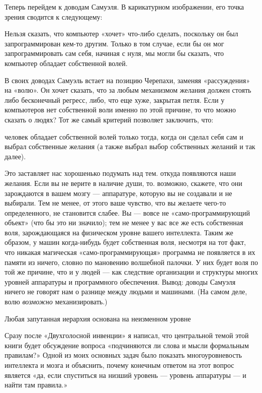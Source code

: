 \documentclass[../main.tex]{subfiles}
\begin{document}
Теперь перейдем к доводам Самуэля. В карикатурном изображении, его точка зрения сводится к следующему:

Нельзя сказать, что компьютер «хочет» что-либо сделать, поскольку он был запрограммирован кем-то другим. Только в том случае, если бы он мог запрограммировать сам себя, начиная с нуля, мы могли бы сказать, что компьютер обладает собственной волей.

В своих доводах Самуэль встает на позицию Черепахи, заменяя «рассуждения» на «волю». Он хочет сказать, что за любым механизмом желания должен стоять либо бесконечный регресс, либо, что еще хуже, закрытая петля. Если у компьютеров нет собственной воли именно по этой причине, то что можно сказать о людях? Тот же самый критерий позволяет заключить, что:

человек обладает собственной волей только тогда, когда он сделал себя сам и выбрал собственные желания (а также выбрал выбор собственных желаний и так далее).

Это заставляет нас хорошенько подумать над тем. откуда появляются наши желания. Если вы не верите в наличие души, то. возможно, скажете, что они зарождаются в вашем мозгу --- аппаратуре, которую вы не создавали и не выбирали. Тем не менее, от этого ваше чувство, что вы желаете чего-то определенного, не становится слабее. Вы --- вовсе не «само-программирующий объект» (что бы это ни значило); тем не менее у вас все же есть собственная воля, зарождающаяся на физическом уровне вашего интеллекта. Таким же образом, у машин когда-нибудь будет собственная воля, несмотря на тот факт, что никакая магическая «само-программирующая» программа не появляется в их памяти из ничего, словно по мановению волшебной палочки. У них будет воля по той же причине, что и у людей --- как следствие организации и структуры многих уровней аппаратуры и программного обеспечения. Вывод: доводы Самуэля ничего не говорят нам о разнице между людьми и машинами. (На самом деле, волю \emph{возможно} механизировать.)

Любая запутанная иерархия основана на неизменном уровне

Сразу после «Двухголосной инвенции» я написал, что центральной темой этой книги будет обсуждение вопроса «подчиняются ли слова и мысли формальным правилам?» Одной из моих основных задач было показать многоуровневость интеллекта и мозга и объяснить, почему конечным ответом на этот вопрос является «да, если спуститься на низший уровень --- уровень аппаратуры --- и найти там правила.»
\end{document}
